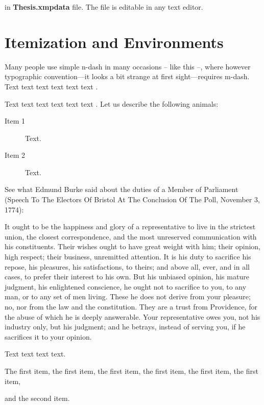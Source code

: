 \noindent in \textbf{Thesis.xmpdata} file. The file is editable in any text editor.


\section{Itemization and Environments}

Many people use simple n-dash in many occasions -- like this --, where however typographic convention---it looks a bit strange at first sight---requires m-dash.
Text text text text text text \citet{Haufler2006}. 

Text text text text text text \citet{Wells2001}. Let us describe the following animals:

\begin{description}
\item[Item 1] Text.
\item[Item 2] Text.
\end{description}

See what Edmund Burke said about the duties of a Member of Parliament (Speech To The Electors Of Bristol At The Conclusion Of The Poll, November 3, 1774):

\begin{quotesmall}
It ought to be the happiness and glory of a representative to live in the strictest union, the closest correspondence, and the most unreserved communication with his constituents. 
Their wishes ought to have great weight with him; their opinion, high respect; their business, unremitted attention.
It is his duty to sacrifice his repose, his pleasures, his satisfactions, to theirs; and above all, ever, and in all cases, to prefer their interest to his own.
But his unbiased opinion, his mature judgment, his enlightened conscience, he ought not to sacrifice to you, to any man, or to any set of men living.
These he does not derive from your pleasure; no, nor from the law and the constitution.
They are a trust from Providence, for the abuse of which he is deeply answerable.
Your representative owes you, not his industry only, but his judgment; and he betrays, instead of serving you, if he sacrifices it to your opinion.
\end{quotesmall}

Text text text text.

\begin{listi}
	\item The first item, the first item, the first item, the first item, the first item, the first item,
	\item and the second item.
\end{listi}

